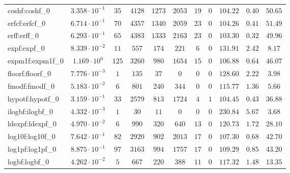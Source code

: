 \begin{tabular}{|l|c|c|c|c|c|c|c|c|c|c|}
coshf:coshf\_0               & $ 3.358 \cdot 10^{-1} $ & $ 35     $ & $ 4128  $ & $ 1273  $ & $ 2053  $ & $ 19  $ & $ 0 $ & $ 104.22      $ & $ 0.40    $ & $ 50.65   $ \\
erfcf:erfcf\_0               & $ 6.714 \cdot 10^{-1} $ & $ 70     $ & $ 4357  $ & $ 1340  $ & $ 2059  $ & $ 23  $ & $ 0 $ & $ 104.26      $ & $ 0.41    $ & $ 51.49   $ \\
erff:erff\_0                 & $ 6.293 \cdot 10^{-1} $ & $ 65     $ & $ 4383  $ & $ 1333  $ & $ 2163  $ & $ 23  $ & $ 0 $ & $ 103.30      $ & $ 0.32    $ & $ 49.96   $ \\
expf:expf\_0                 & $ 8.339 \cdot 10^{-2} $ & $ 11     $ & $ 557   $ & $ 174   $ & $ 221   $ & $ 6   $ & $ 0 $ & $ 131.91      $ & $ 2.42    $ & $ 8.17    $ \\
expm1f:expm1f\_0             & $ 1.169 \cdot 10^{0}  $ & $ 125    $ & $ 3260  $ & $ 980   $ & $ 1654  $ & $ 15  $ & $ 0 $ & $ 106.88      $ & $ 0.64    $ & $ 46.07   $ \\
floorf:floorf\_0             & $ 7.776 \cdot 10^{-3} $ & $ 1      $ & $ 135   $ & $ 37    $ & $ 0     $ & $ 0   $ & $ 0 $ & $ 128.60      $ & $ 2.22    $ & $ 3.98    $ \\
fmodf:fmodf\_0               & $ 5.183 \cdot 10^{-2} $ & $ 6      $ & $ 801   $ & $ 240   $ & $ 344   $ & $ 0   $ & $ 0 $ & $ 115.77      $ & $ 1.36    $ & $ 5.66    $ \\
hypotf:hypotf\_0             & $ 3.159 \cdot 10^{-1} $ & $ 33     $ & $ 2579  $ & $ 813   $ & $ 1724  $ & $ 4   $ & $ 1 $ & $ 104.45      $ & $ 0.43    $ & $ 36.88   $ \\
ilogbf:ilogbf\_0             & $ 4.332 \cdot 10^{-3} $ & $ 1      $ & $ 30    $ & $ 11    $ & $ 0     $ & $ 0   $ & $ 0 $ & $ 230.84      $ & $ 5.67    $ & $ 3.68    $ \\
ldexpf:ldexpf\_0             & $ 4.970 \cdot 10^{-2} $ & $ 6      $ & $ 990   $ & $ 320   $ & $ 640   $ & $ 13  $ & $ 0 $ & $ 120.73      $ & $ 1.72    $ & $ 28.10   $ \\
log10f:log10f\_0             & $ 7.642 \cdot 10^{-1} $ & $ 82     $ & $ 2920  $ & $ 902   $ & $ 2013  $ & $ 17  $ & $ 0 $ & $ 107.30      $ & $ 0.68    $ & $ 42.70   $ \\
log1pf:log1pf\_0             & $ 8.875 \cdot 10^{-1} $ & $ 97     $ & $ 3163  $ & $ 994   $ & $ 1757  $ & $ 17  $ & $ 0 $ & $ 109.29      $ & $ 0.85    $ & $ 43.20   $ \\
logbf:logbf\_0               & $ 4.262 \cdot 10^{-2} $ & $ 5      $ & $ 667   $ & $ 220   $ & $ 388   $ & $ 11  $ & $ 0 $ & $ 117.32      $ & $ 1.48    $ & $ 13.35   $ \\

\end{tabular}
